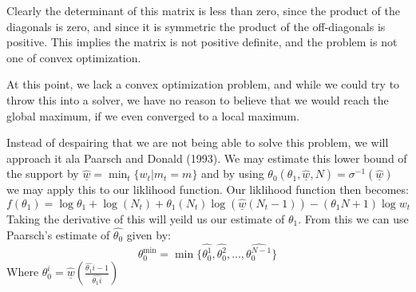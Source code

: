 \documentclass[10pt]{paper}
\begin{document}
Clearly the determinant of this matrix is less than zero, since the
product of the diagonals is zero, and since it is symmetric the
product of the off-diagonals is positive. This implies the matrix is
not positive definite, and the problem is not one of convex
optimization.

At this point, we lack a convex optimization problem, and while we
could try to throw this into a solver, we have no reason to believe
that we would reach the global maximum, if we even converged to a
local maximum. 

Instead of despairing that we are not being able to solve this problem, we will
approach it ala Paarsch and Donald (1993). We may estimate this
lower bound of the support by $\underline{\hat{w}} = \min_t \{ w_t |
m_t = m \}$ and by using $\theta_0( \theta_1,\underline{\hat{w}},N) = \sigma^{-1}(\underline{\hat{w}})$ we
may apply this to our liklihood function. Our liklihood function then
becomes:
$$ f( \theta_1 ) = \log \theta_1 + \log (N_t) + \theta_1(N_t) \log
(\underline{\hat{w}} ( N_t - 1)) - (\theta_1N + 1) \log w_t$$
Taking the derivative of this will yeild us our estimate of $\theta_1$.
From this we can use Paarsch's estimate of $\hat{\theta_0}$ given by:
$$\theta_0^{\min} = \min \{ \hat{\theta_0^1},\hat{\theta_0^2}, ..., \hat{\theta_0^{N-1}}
\}$$
Where $\theta_0^i = \underline{\hat{w}} \left ( \frac{\hat{\theta_1}i -
    1}{\hat{\theta_1 i}} \right )$



  
\end{document}

